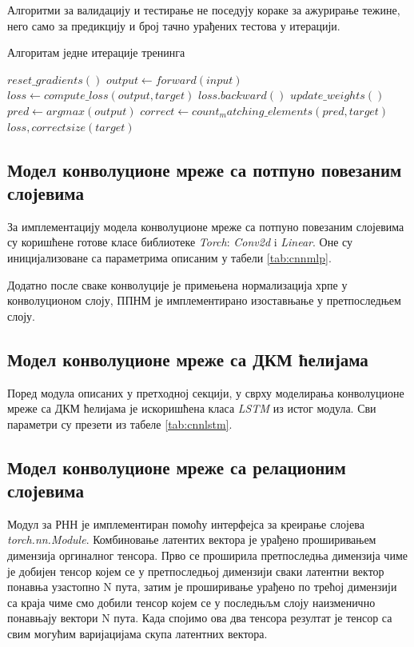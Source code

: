 \documentclass[a4paper, 12pt, master, utf8]{etf}
\begin{document}
Алгоритми за валидацију и тестирање не поседују кораке за ажурирање тежине, него само за предикцију и број тачно урађених тестова у итерацији.


\begin{algorithm}[h]
    \caption{Алгоритам једне итерације тренинга}
    \label{alg3}
    \begin{algorithmic}[1]
        \State $ reset\_gradients()$
        \State $output \gets forward(input)$
        \State $loss \gets compute\_loss(output, target)$
        \State $loss.backward()$
        \State $update\_weights()$
        \State $pred \gets argmax(output)$
        \State $correct \gets count_matching\_elements(pred, target)$
        \State \Return $loss, correct size(target)$
    \EndProcedure
    \end{algorithmic}
    \end{algorithm}

\subsection{Модел конволуционе мреже са потпуно повезаним слојевима} 
За имплементацију модела конволуционе мреже са потпуно повезаним слојевима су коришћене готове класе библиотеке 
\textit{Torch}: \textit{Conv2d} i \textit{Linear}. Оне су иницијализоване са параметрима описаним у табели \ref{tab:cnnmlp}.

Додатно после сваке конволуције је примењена нормализација хрпе у конволуционом слоју, ППНМ је имплементирано изоставњање у претпоследњем слоју.

\subsection{Модел конволуционе мреже са ДКМ ћелијама}
Поред модула описаних у претходној секцији, у сврху моделирања конволуционе мреже са ДКМ ћелијама је искоришћена класа \textit{LSTM} из истог модула.
Сви параметри су презети из табеле \ref{tab:cnnlstm}.

\subsection{Модел конволуционе мреже са релационим слојевима}

Модул за РНН је имплементиран помоћу интерфејса за креирање слојева \textit{torch.nn.Module}. 
Комбиновање латентих вектора је урађено проширивањем димензија оргиналног тенсора. Прво се проширила претпоследња димензија чиме
је добијен тенсор којем се у претпоследњој димензији сваки латентни вектор понавња узастопно N пута, затим је проширивање урађено 
по трећој димензији са краја чиме смо добили тенсор којем се у последњљм слоју наизменично понавњају вектори N пута. Када спојимо 
ова два тенсора резултат је тенсор са свим могућим варијацијама скупа латентних вектора.
\end{document}
